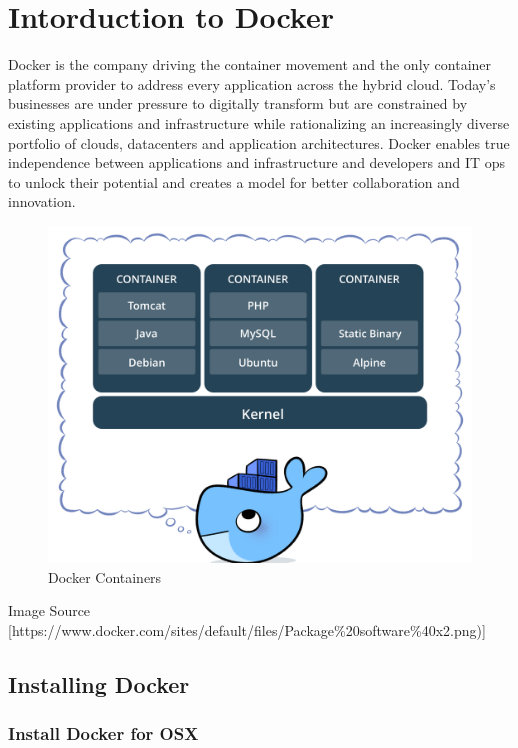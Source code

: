 \section{Intorduction to Docker}\label{intorduction-to-docker}

Docker is the company driving the container movement and the only
container platform provider to address every application across the
hybrid cloud. Today's businesses are under pressure to digitally
transform but are constrained by existing applications and
infrastructure while rationalizing an increasingly diverse portfolio of
clouds, datacenters and application architectures. Docker enables true
independence between applications and infrastructure and developers and
IT ops to unlock their potential and creates a model for better
collaboration and innovation.

\begin{figure}
\centering
\includegraphics{images/container-1.png}
\caption{Docker Containers}
\end{figure}

Image Source
{[}https://www.docker.com/sites/default/files/Package\%20software\%40x2.png){]}

\subsection{Installing Docker}\label{install-docker}

\subsubsection{Install Docker for OSX}\label{install-docker-for-osx}

